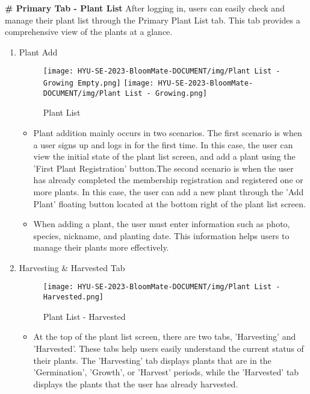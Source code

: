 \documentclass[conference, a4paper]{IEEEtran}
\begin{document}
\textbf{\# Primary Tab - Plant List}
\newline
After logging in, users can easily check and manage their plant list through the Primary Plant List tab. This tab provides a comprehensive view of the plants at a glance.
\begin{enumerate}
    \item Plant Add
        \begin{figure}[h]
    \centerline{
        \texttt{[image: HYU-SE-2023-BloomMate-DOCUMENT/img/Plant List - Growing Empty.png]}
        \texttt{[image: HYU-SE-2023-BloomMate-DOCUMENT/img/Plant List - Growing.png]}
    }
    \label{fig}
    \caption{Plant List}
    \end{figure}
    \begin{itemize}
        \item Plant addition mainly occurs in two scenarios. The first scenario is when a user signs up and logs in for the first time. In this case, the user can view the initial state of the plant list screen, and add a plant using the 'First Plant Registration' button.The second scenario is when the user has already completed the membership registration and registered one or more plants. In this case, the user can add a new plant through the 'Add Plant' floating button located at the bottom right of the plant list screen.
        \item When adding a plant, the user must enter information such as photo, species, nickname, and planting date. This information helps users to manage their plants more effectively.
    \end{itemize}
    \item Harvesting \& Harvested Tab
    \begin{figure}[h]
        \centering
        \texttt{[image: HYU-SE-2023-BloomMate-DOCUMENT/img/Plant List - Harvested.png]}
        \caption{Plant List - Harvested}
        \label{fig:Harvested}
    \end{figure}
    
    \begin{itemize}
        \item At the top of the plant list screen, there are two tabs, 'Harvesting' and 'Harvested'. These tabs help users easily understand the current status of their plants. The 'Harvesting' tab displays plants that are in the 'Germination', 'Growth', or 'Harvest' periods, while the 'Harvested' tab displays the plants that the user has already harvested.
    \end{itemize}
    

\end{enumerate}
\end{document}
